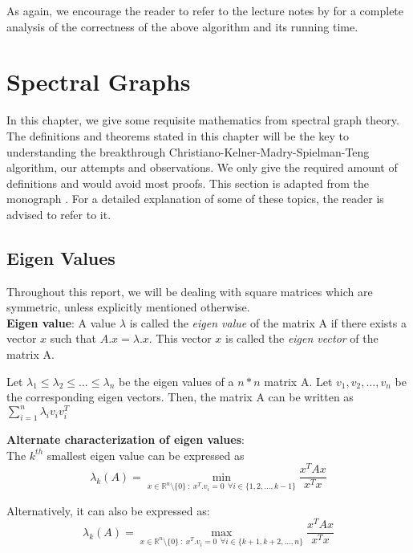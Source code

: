 \documentclass[BTech]{iitmdiss}
\begin{document}
	    As again, we encourage the reader to refer to the lecture notes by \cite{williamson} for a complete analysis of the correctness of the above algorithm
	    and its running time.
	 \chapter{Spectral Graphs}
	     In this chapter, we give some requisite mathematics from spectral graph theory. The definitions and theorems stated in this chapter
	     will be the key to understanding the breakthrough Christiano-Kelner-Madry-Spielman-Teng algorithm, our attempts and observations. We only give the required amount of definitions and would avoid most proofs. This section is adapted from the monograph \cite{DBLP:journals/fttcs/Vishnoi13}.
	     For a detailed explanation of some of these topics, the reader is advised to refer to it.\\
	     
	     \section{Eigen Values}
	       Throughout this report, we will be dealing with square matrices which are symmetric, unless explicitly mentioned otherwise. \\
	       
	       \textbf{Eigen value}: A value $\lambda$ is called the \textit{eigen value} of the matrix A if there exists a vector $x$ such that 
	       $A.x = \lambda . x$. This vector $x$ is called the \textit{eigen vector} of the matrix A. \\
	       
	       \begin{prop}
	       Let $\lambda_1 \leq \lambda_2 \leq \ldots \leq \lambda_n$ be the eigen values of a $n \ast n$ matrix
	       A. Let $v_1 , v_2 , \ldots, v_n$ be the corresponding eigen vectors. Then, the matrix A can be written as $\displaystyle\sum_{i=1}^{n} \lambda_i v_i v_i^T$ 
	       \end{prop}
	       
	       \textbf{Alternate characterization of eigen values}: \\
	       
		The $k^{th}$ smallest eigen value can be expressed as 
		$$\lambda_k(A) = \displaystyle\min_{x \in \mathbb{R}^n \setminus \{0\}~:~x^T.v_i = 0~~\forall i \in \{1,2,\ldots,k-1\}} \frac{x^TAx}{x^Tx}$$
		
		Alternatively, it can also be expressed as:
		$$\lambda_k(A) = \displaystyle\max_{x \in \mathbb{R}^n \setminus \{0\}~:~x^T.v_i = 0~~\forall i \in \{k+1,k+2,\ldots,n\}} \frac{x^TAx}{x^Tx}$$
	       
\end{document}
